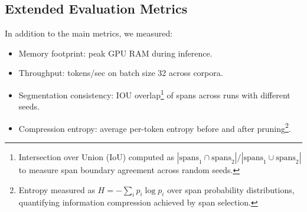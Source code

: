 \subsection{Extended Evaluation Metrics}
\label{sec:extended-metrics}

In addition to the main metrics, we measured:
\begin{itemize}[leftmargin=1.5em]
	\item Memory footprint: peak GPU RAM during inference.
	\item Throughput: tokens/sec on batch size 32 across corpora.
	\item Segmentation consistency: IOU overlap\footnote{Intersection over Union (IoU) computed as $|\text{spans}_1 \cap \text{spans}_2| / |\text{spans}_1 \cup \text{spans}_2|$ to measure span boundary agreement across random seeds.} of spans across runs with different seeds.
	\item Compression entropy: average per-token entropy before and after pruning\footnote{Entropy measured as $H = -\sum_i p_i \log p_i$ over span probability distributions, quantifying information compression achieved by span selection.}.
\end{itemize}
